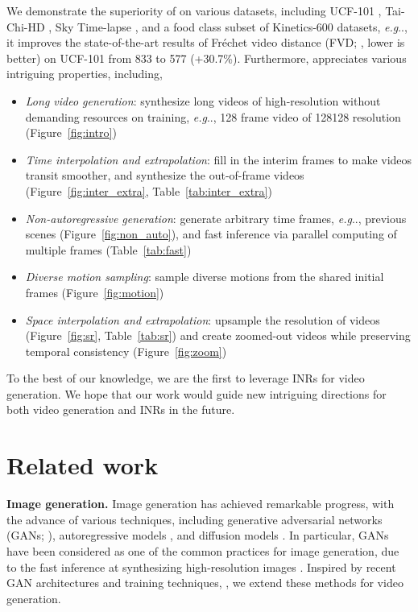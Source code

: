 \documentclass{article} \usepackage{iclr2022_conference,times}
\makeatletter
\DeclareRobustCommand\onedot{\futurelet\@let@token\@onedot}
\def\@onedot{\ifx\@let@token.\else.\null\fi\xspace}
\def\eg{\emph{e.g}\onedot} \def\Eg{\emph{E.g}\onedot}
\makeatother
\begin{document}
We demonstrate the superiority of \sname on various datasets, including UCF-101 \citep{soomro2012ucf101}, Tai-Chi-HD \citep{siarohin2019first}, Sky Time-lapse \citep{xiong2018learning}, and a food class subset of Kinetics-600 \citep{carreira2018short} datasets, \eg, it improves the state-of-the-art results of Fr\'echet video distance (FVD; \citet{unterthiner2018towards}, lower is better) on UCF-101 from 833 to 577 (+30.7\%). Furthermore,  \sname appreciates various intriguing properties, including,
\begin{itemize}[topsep=0.0pt,itemsep=1.0pt,leftmargin=5.5mm]
    \item \emph{Long video generation}: 
    synthesize long videos of high-resolution without demanding resources on training, \eg, 128 frame video of 128128 resolution
    (Figure~\ref{fig:intro})
    \item \emph{Time interpolation and extrapolation}: fill in the interim frames to make videos transit smoother, and synthesize the out-of-frame videos (Figure~\ref{fig:inter_extra}, Table~\ref{tab:inter_extra})
    \item \emph{Non-autoregressive generation}: generate arbitrary time frames, \eg, previous scenes (Figure~\ref{fig:non_auto}), and fast inference via parallel computing of multiple frames (Table~\ref{tab:fast})
    \item \emph{Diverse motion sampling}: sample diverse motions from the shared initial frames (Figure~\ref{fig:motion})
    \item \emph{Space interpolation and extrapolation}: upsample the resolution of videos (Figure~\ref{fig:sr}, Table~\ref{tab:sr}) and create zoomed-out videos while preserving temporal consistency (Figure~\ref{fig:zoom})
\end{itemize}
To the best of our knowledge, we are the first to leverage INRs for video generation. We hope that our work would guide new intriguing directions for both video generation and INRs in the future.


\section{Related work}
\label{sec:related}

\textbf{Image generation.}
Image generation has achieved remarkable progress, with the advance of various techniques, including generative adversarial networks (GANs; \citet{goodfellow2014generative}), autoregressive models \citep{ramesh2021zero}, and diffusion models \citep{dhariwal2021diffusion}. In particular, GANs have been considered as one of the common practices for image generation, due to the fast inference at synthesizing high-resolution images \citep{brock2018large,karras2020analyzing,karras2021alias}. Inspired by recent GAN architectures \citep{karras2020analyzing,skorokhodov2021adversarial} and training techniques, \citep{zhao2020differentiable,karras2020training}, we extend these methods for video generation.
\end{document}
